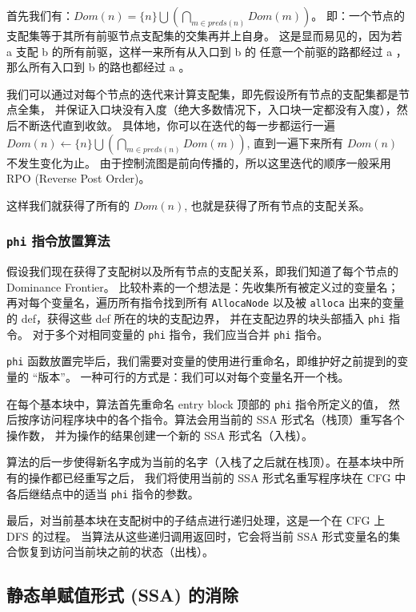 首先我们有：$\mathit{Dom}(n) = \{n\} \bigcup \left(\bigcap_{m\in \mathit{preds}(n)} \mathit{Dom}(m)\right)$。
即：一个节点的支配集等于其所有前驱节点支配集的交集再并上自身。
这是显而易见的，因为若 a 支配 b 的所有前驱，这样一来所有从入口到 b 的
任意一个前驱的路都经过 a ，那么所有入口到 b 的路也都经过 a 。

我们可以通过对每个节点的迭代来计算支配集，即先假设所有节点的支配集都是节点全集，
并保证入口块没有入度（绝大多数情况下，入口块一定都没有入度），然后不断迭代直到收敛。
具体地，你可以在迭代的每一步都运行一遍 $\mathit{Dom}(n) \leftarrow \{n\} \bigcup
\left(\bigcap_{m\in \mathit{preds}(n)} \mathit{Dom}(m)\right)$,
直到一遍下来所有 $\mathit{Dom}(n)$ 不发生变化为止。
由于控制流图是前向传播的，所以这里迭代的顺序一般采用 RPO (Reverse Post Order)。

这样我们就获得了所有的 $\mathit{Dom}(n)$, 也就是获得了所有节点的支配关系。

\subsubsection{\texttt{phi} 指令放置算法}

假设我们现在获得了支配树以及所有节点的支配关系，即我们知道了每个节点的 Dominance Frontier。
比较朴素的一个想法是：先收集所有被定义过的变量名；再对每个变量名，遍历所有指令找到所有 \texttt{AllocaNode}
以及被 \texttt{alloca} 出来的变量的 def，获得这些 def 所在的块的支配边界，
并在支配边界的块头部插入 \texttt{phi} 指令。
对于多个对相同变量的 \texttt{phi} 指令，我们应当合并 \texttt{phi} 指令。

\texttt{phi} 函数放置完毕后，我们需要对变量的使用进行重命名，即维护好之前提到的变量的 “版本”。
一种可行的方式是：我们可以对每个变量名开一个栈。

在每个基本块中，算法首先重命名 entry block 顶部的 \texttt{phi} 指令所定义的值，
然后按序访问程序块中的各个指令。算法会用当前的 SSA 形式名（栈顶）重写各个操作数，
并为操作的结果创建一个新的 SSA 形式名（入栈）。

算法的后一步使得新名字成为当前的名字（入栈了之后就在栈顶）。在基本块中所有的操作都已经重写之后，
我们将使用当前的 SSA 形式名重写程序块在 CFG 中各后继结点中的适当 \texttt{phi} 指令的参数。

最后，对当前基本块在支配树中的子结点进行递归处理，这是一个在 CFG 上 DFS 的过程。
当算法从这些递归调用返回时，它会将当前 SSA 形式变量名的集合恢复到访问当前块之前的状态（出栈）。

\subsection{静态单赋值形式 (SSA) 的消除} \label{SSA-eliminate-phi}

